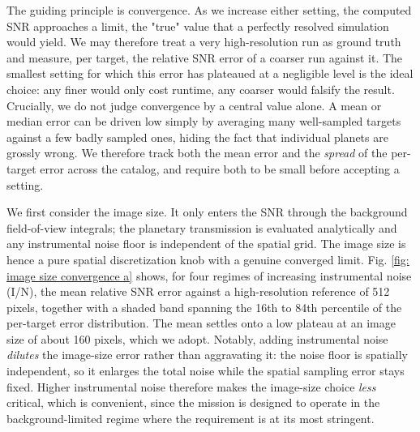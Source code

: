 \documentclass[12pt,a4paper]{article}
\numberwithin{equation}{section}
\numberwithin{figure}{section}
\numberwithin{table}{section}
\begin{document}
The guiding principle is convergence. As we increase either setting, the computed SNR approaches a limit, the "true" value that a perfectly resolved simulation would yield. We may therefore treat a very high-resolution run as ground truth and measure, per target, the relative SNR error of a coarser run against it. The smallest setting for which this error has plateaued at a negligible level is the ideal choice: any finer would only cost runtime, any coarser would falsify the result. Crucially, we do not judge convergence by a central value alone. A mean or median error can be driven low simply by averaging many well-sampled targets against a few badly sampled ones, hiding the fact that individual planets are grossly wrong. We therefore track both the mean error and the \textit{spread} of the per-target error across the catalog, and require both to be small before accepting a setting.

We first consider the image size. It only enters the SNR through the background field-of-view integrals; the planetary transmission is evaluated analytically and any instrumental noise floor is independent of the spatial grid. The image size is hence a pure spatial discretization knob with a genuine converged limit. Fig. \ref{fig: image size convergence a} shows, for four regimes of increasing instrumental noise (I/N), the mean relative SNR error against a high-resolution reference of 512 pixels, together with a shaded band spanning the 16th to 84th percentile of the per-target error distribution. The mean settles onto a low plateau at an image size of about 160 pixels, which we adopt. Notably, adding instrumental noise \textit{dilutes} the image-size error rather than aggravating it: the noise floor is spatially independent, so it enlarges the total noise while the spatial sampling error stays fixed. Higher instrumental noise therefore makes the image-size choice \textit{less} critical, which is convenient, since the mission is designed to operate in the background-limited regime where the requirement is at its most stringent.
\end{document}
